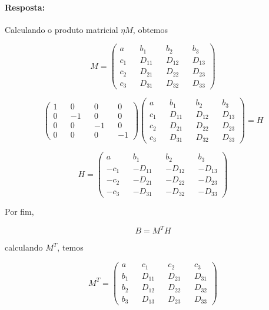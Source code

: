 \documentclass[10pt,a4paper]{article}
\begin{document}
\begin{enumerate}
\paragraph{Resposta:}
Calculando o produto matricial $ \eta M $, obtemos

\begin{equation}\nonumber
	M = \left(\begin{matrix}
		a && b_1 && b_2 && b_3 \\
		c_1 && D_{11} && D_{12} && D_{13} \\
		c_2 && D_{21} && D_{22} && D_{23}\\
		c_3 && D_{31} && D_{32} && D_{33}
	\end{matrix}\right) 
\end{equation}

\begin{equation}\nonumber
	\left(\begin{matrix}
		1 && 0 && 0 && 0 \\
		0 && -1 && 0 && 0 \\
		0 && 0 && -1 && 0 \\
		0 && 0 && 0 && -1
	\end{matrix}\right)
	\left(\begin{matrix}
		a && b_1 && b_2 && b_3 \\
		c_1 && D_{11} && D_{12} && D_{13} \\
		c_2 && D_{21} && D_{22} && D_{23}\\
		c_3 && D_{31} && D_{32} && D_{33}
	\end{matrix}\right) = H
\end{equation}

$$H = 	\left(\begin{matrix}
	a && b_1 && b_2 && b_3 \\
	-c_1 && -D_{11} && -D_{12} && -D_{13} \\
	-c_2 && -D_{21} && -D_{22} && -D_{23}\\
	-c_3 && -D_{31} && -D_{32} && -D_{33}
\end{matrix}\right)$$
\end{enumerate}
Por fim,

$$B = M^{T}H$$

calculando $ M^{T} $, temos

\begin{equation}\nonumber
	M^{T} = \left(\begin{matrix}
	a && c_1 && c_2 && c_3 \\
	b_1 && D_{11} && D_{21} && D_{31}\\
	b_2 && D_{12} && D_{22} && D_{32} \\
	b_3 && D_{13} && D_{23} && D_{33}
	\end{matrix}\right) 
\end{equation}
\end{document}

